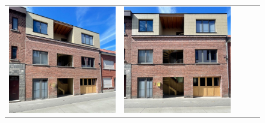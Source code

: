 \begin{figure}[H]
{\begin{tabular}{@{}ccccc@{}}
      \includegraphics[width=\linewidth]{Images/LoRAs/Geleding/Training_images/3.jpeg} &
      \includegraphics[width=\linewidth]{Images/LoRAs/Geleding/Training_images/4.jpeg} &

\end{tabular}}
\end{figure}
